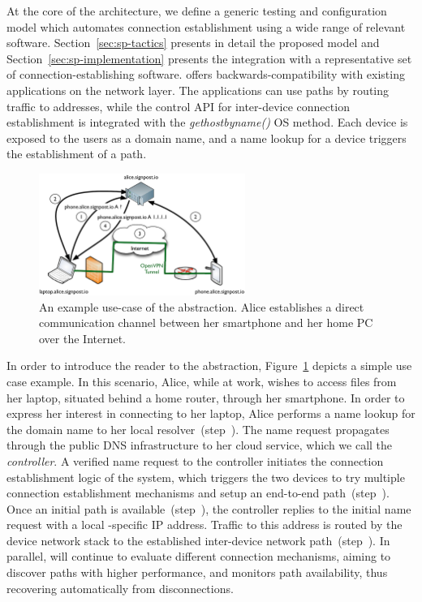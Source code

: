 At the core of the \signpost architecture, we define a generic testing and
configuration model which automates connection establishment using a wide range
of relevant software. Section~\ref{sec:sp-tactics} presents in detail the
proposed model and Section~\ref{sec:sp-implementation} presents the integration
with a representative set of connection-establishing software. \signpost offers
backwards-compatibility with existing applications on the network layer. The
applications can use \signpost paths by routing traffic to  \signpost addresses,
while the control API for inter-device connection establishment is integrated
with the \textit{gethostbyname()} OS method.  Each device is exposed to the
users as a domain name, and a name lookup for a device triggers the establishment
of a \signpost path. 

\begin{figure}[ht]
  \begin{center}
	\includegraphics[width=0.6\textwidth]{Chapter3/Chapter3Figs/sp-illustration}
  \end{center}
  \caption[\signpost example use-case.]{An example use-case of the \signpost
    abstraction. Alice establishes a direct communication channel between
    her smartphone and her home PC over the Internet.}
  \label{fig:signpost-user-abstraction}
\end{figure}

In order to introduce the reader to the \signpost abstraction,
Figure~\ref{fig:signpost-user-abstraction} depicts a simple use case example.
In this scenario, Alice, while at work, wishes to access files from her laptop,
situated behind a home router, through her smartphone. In order to express her
interest in connecting to her laptop, Alice performs a name lookup for the
domain name  to her local \signpost
resolver~(step~).  The name request propagates through the public DNS
infrastructure to her \signpost cloud service, which we call the {\it \signpost
controller}. A verified name request to the \signpost controller initiates the
connection establishment logic of the system, which triggers the two devices to
try multiple connection establishment mechanisms and setup an end-to-end
path~(step~). Once an initial path is available~(step~),
the controller replies to the initial name request with a local
\signpost-specific IP address. Traffic to this address is routed by the device
network stack to the established inter-device network path~(step~).
In parallel, \signpost will continue to evaluate different connection
mechanisms, aiming to discover paths with higher performance, and monitors path
availability, thus recovering automatically from disconnections. 

